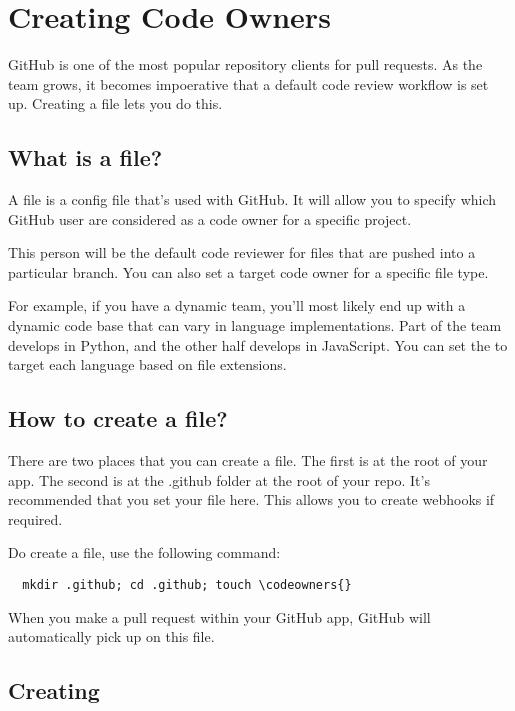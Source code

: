 
\chapter{ Creating Code Owners }

GitHub is one of the most popular repository clients for pull requests. As the team grows, it becomes impoerative that a default code review workflow is set up. Creating a \codeowners{} file lets you do this.


\section{ What is a \codeowners{} file? }
A \codeowners{} file is a config file that's used with GitHub. It will allow you to specify which GitHub user are considered as a  code owner for a specific project.

This person will be the default code reviewer for files that are pushed into a particular branch. You can also set a target code owner for a specific file type.

For example, if you have a dynamic team, you'll most likely end up with a dynamic code base that can vary in language implementations. Part of the team develops in Python, and the other half develops in JavaScript. You can set the \codeowners{} to target each language based on file extensions. 

\section{ How to create a \codeowners{} file? }
There are two places that you can create a \codeowners{} file. The first is at the root of your app. The second is at the .github folder at the root of your repo. It's recommended that you set your \codeowners{} file here. This allows you to create webhooks if required. 

Do create a \codeowners{} file, use the following command:

\begin{verbatim}
  mkdir .github; cd .github; touch \codeowners{}
\end{verbatim}

When you make a pull request within your GitHub app, GitHub will automatically pick up on this file.

\section{ Creating \codeowners{} }

